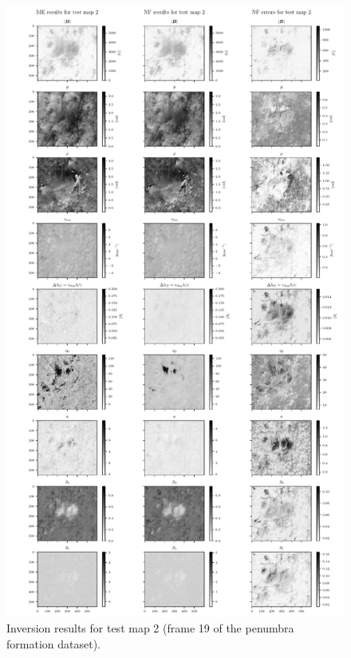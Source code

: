 \documentclass[a4paper,12pt]{report}
\begin{document}
\begin{figure}[h]
\centering
\includegraphics[height=\textheight-1cm]{figures/nf-milne-eddington-example-2-nflows-piecewisequadratic-comp-ME-NF-testmap2.pdf}
\caption{Inversion results for test map 2 (frame 19 of the penumbra formation dataset).}
\label{fig:nf-milne-eddington-example-2-nflows-piecewisequadratic-comp-ME-NF-testmap2}
\end{figure}
\end{document}
